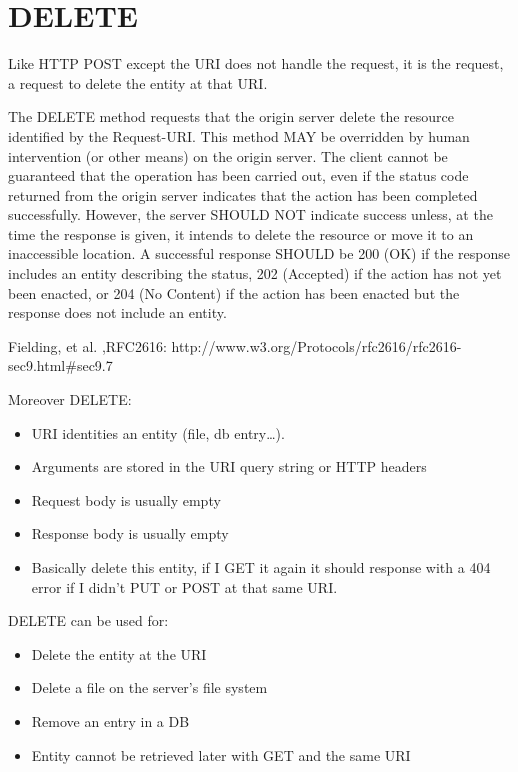 \documentclass[../CMPUT-404-Notes.tex]{subfiles}
\begin{document}
\section{DELETE}
Like HTTP POST except the URI does not handle the request, it is the request, a request to delete the entity at that URI. 
\begin{DndReadAloud}[color=bgtan]
  The DELETE method requests that the origin server delete the resource identified by the Request-URI. This method MAY be overridden by human intervention (or other means) on the origin server. The client cannot be guaranteed that the operation has been carried out, even if the status code returned from the origin server indicates that the action has been completed successfully. However, the server SHOULD NOT indicate success unless, at the time the response is given, it intends to delete the resource or move it to an inaccessible location. A successful response SHOULD be 200 (OK) if the response includes an entity describing the status, 202 (Accepted) if the action has not yet been enacted, or 204 (No Content) if the action has been enacted but the response does not include an entity.
\newline

Fielding, et al. ,RFC2616: http://www.w3.org/Protocols/rfc2616/rfc2616-sec9.html\#sec9.7
\end{DndReadAloud}

Moreover DELETE:
\begin{itemize}
  \item URI identities an entity (file, db entry\ldots).
  \item Arguments are stored in the URI query string or HTTP headers
  \item Request body is usually empty
  \item Response body is usually empty
  \item Basically delete this entity, if I GET it again it should response with a 404 error if I didn't PUT or POST at that same URI. 
\end{itemize}

DELETE can be used for:
\begin{itemize}
  \item Delete the entity at the URI
  \item Delete a file on the server's file system
  \item Remove an entry in a DB
  \item Entity cannot be retrieved later with GET and the same URI
\end{itemize}
\end{document}
